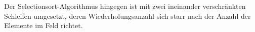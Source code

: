 \documentclass{lehramt-informatik-aufgabe}
\begin{document}
\begin{enumerate}
\begin{liAntwort}
Der Selectionsort-Algorithmus hingegen ist mit zwei ineinander
verschränkten Schleifen umgesetzt, deren Wiederholungsanzahl sich starr
nach der Anzahl der Elemente im Feld richtet.




\end{liAntwort}

\end{enumerate}
\end{document}
